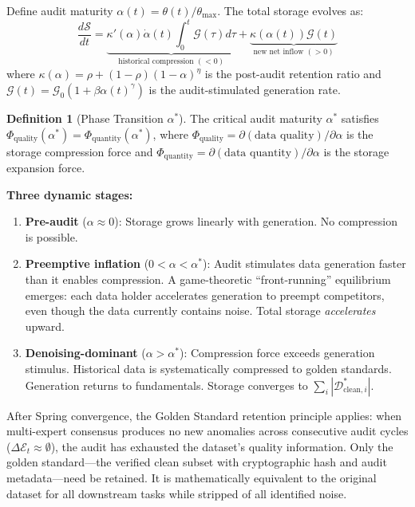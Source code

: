 \documentclass[twocolumn]{article}
\theoremstyle{definition}
\newtheorem{definition}{Definition}
\begin{document}
Define audit maturity $\alpha(t) = \theta(t)/\theta_{\max}$. The total storage evolves as:
\begin{equation}
\frac{d\mathcal{S}}{dt} = \underbrace{\kappa'(\alpha)\dot{\alpha}(t)\int_0^t \mathcal{G}(\tau)d\tau}_{\text{historical compression } (<0)} + \underbrace{\kappa(\alpha(t))\mathcal{G}(t)}_{\text{new net inflow } (>0)}
\end{equation}
where $\kappa(\alpha) = \rho + (1-\rho)(1-\alpha)^\eta$ is the post-audit retention ratio and $\mathcal{G}(t) = \mathcal{G}_0(1 + \beta\alpha(t)^\gamma)$ is the audit-stimulated generation rate.

\begin{definition}[Phase Transition $\alpha^*$]
The critical audit maturity $\alpha^*$ satisfies $\Phi_{\text{quality}}(\alpha^*) = \Phi_{\text{quantity}}(\alpha^*)$, where $\Phi_{\text{quality}} = \partial(\text{data quality})/\partial\alpha$ is the storage compression force and $\Phi_{\text{quantity}} = \partial(\text{data quantity})/\partial\alpha$ is the storage expansion force.
\end{definition}

\textbf{Three dynamic stages:}
\begin{enumerate}[nosep,leftmargin=*,itemsep=1pt]
  \item \textbf{Pre-audit} ($\alpha \approx 0$): Storage grows linearly with generation. No compression is possible.
  \item \textbf{Preemptive inflation} ($0 < \alpha < \alpha^*$): Audit stimulates data generation faster than it enables compression. A game-theoretic ``front-running'' equilibrium emerges: each data holder accelerates generation to preempt competitors, even though the data currently contains noise. Total storage \emph{accelerates} upward.
  \item \textbf{Denoising-dominant} ($\alpha > \alpha^*$): Compression force exceeds generation stimulus. Historical data is systematically compressed to golden standards. Generation returns to fundamentals. Storage converges to $\sum_i |\mathcal{D}_{\text{clean}, i}^*|$.
\end{enumerate}

After Spring convergence, the Golden Standard retention principle applies: when multi-expert consensus produces no new anomalies across consecutive audit cycles ($\Delta\mathcal{E}_t \approx \emptyset$), the audit has exhausted the dataset's quality information. Only the golden standard---the verified clean subset with cryptographic hash and audit metadata---need be retained. It is mathematically equivalent to the original dataset for all downstream tasks while stripped of all identified noise.
\end{document}
